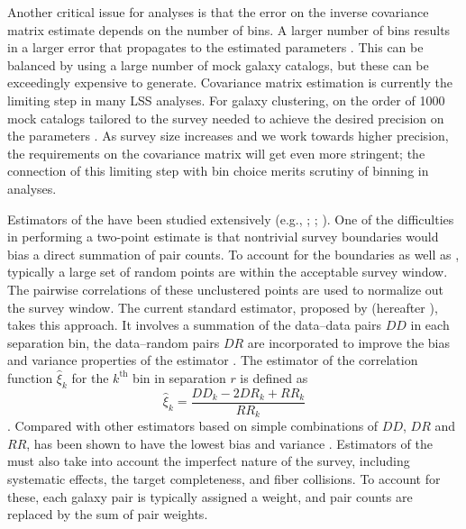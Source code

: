 Another critical issue for \cf analyses is that the error on the inverse covariance matrix estimate depends on the number of bins.
A larger number of bins results in a larger error that propagates to the estimated parameters \citep{Dodelson2013}.
This can be balanced by using a large number of mock galaxy catalogs, but these can be exceedingly expensive to generate.
Covariance matrix estimation is currently the limiting step in many LSS analyses.
For galaxy clustering, on the order of 1000 mock catalogs tailored to the survey needed to achieve the desired precision on the parameters \citep{Percival2014}.
As survey size increases and we work towards higher precision, the requirements on the covariance matrix will get even more stringent; the connection of this limiting step with bin choice merits scrutiny of binning in \cf analyses.

Estimators of the \cf have been studied extensively (e.g., \citealt{PeeblesHauser1974}; \citealt{DavisPeebles1983}; \citealt{Hamilton1993}).
One of the difficulties in performing a two-point estimate is that nontrivial survey boundaries would bias a direct summation of pair counts.
To account for the boundaries as well as , typically a large set of random points are  within the acceptable survey window.
The pairwise correlations of these unclustered points are used to normalize out the survey window.
The current standard estimator, proposed by \cite{LandySzalay1993} (hereafter \LS), takes this approach.
It involves a summation of the data--data pairs $DD$ in each separation bin,  the data--random pairs $DR$ are incorporated to improve the bias and variance properties of the estimator .
The \LS estimator of the correlation function $\hat{\xi}_k$ for the $k^\mathrm{th}$ bin in separation $r$ is defined as
\begin{equation} \label{eq:lsintro}
\hat{\xi}_k = \frac{DD_k - 2DR_k + RR_k}{RR_k}
\end{equation}
.
Compared with other estimators based on simple combinations of $DD$, $DR$ and $RR$, \LS has been shown to have the lowest bias and variance \citep{Kerscher2000}.
Estimators of the \cf must also take into account the imperfect nature of the survey, including systematic effects, the target completeness, and fiber collisions.
To account for these, each galaxy pair is typically assigned a weight, and pair counts are replaced by the sum of pair weights.


